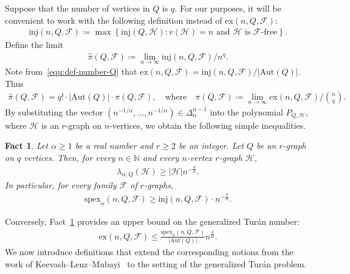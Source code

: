 \documentclass[11pt,a4paper]{article}
\newtheorem{fact}[definition]{Fact}
\begin{document}
Suppose that the number of vertices in $Q$ is $q$.
For our purposes, it will be convenient to work with the following definition instead of $\mathrm{ex}(n, Q, \mathcal{F})$: 
\begin{align*}
    \mathrm{inj}(n,Q,\mathcal{F})
    \coloneqq \max\left\{\mathrm{inj}(Q,\mathcal{H}) \colon  \text{$v(\mathcal{H}) = n$ and $\mathcal{H}$ is $\mathcal{F}$-free} \right\}. 
\end{align*}
%
Define the limit  
\begin{align*}
    \hat{\pi}(Q,\mathcal{F})
    \coloneqq \lim_{n \to \infty} {\mathrm{inj}(n,Q,\mathcal{F})}/{n^{q}}. 
\end{align*}
%
Note from~\eqref{equ:def-number-Q} that $\mathrm{ex}(n,Q,\mathcal{F}) = {\mathrm{inj}(n,Q,\mathcal{F})}/{|\mathrm{Aut}(Q)|}$. Thus 
\begin{align*}
    \hat{\pi}(Q,\mathcal{F})
    = q! \cdot |\mathrm{Aut}(Q)| \cdot \pi(Q,\mathcal{F}), 
    \quad\text{where}\quad 
    \pi(Q,\mathcal{F}) 
    \coloneqq \lim_{n \to \infty} {\mathrm{ex}(n,Q,\mathcal{F})}/{\binom{n}{q}}. 
\end{align*}
%
By substituting the vector $(n^{-1/\alpha}, \ldots, n^{-1/\alpha}) \in \Delta_{\alpha}^{n-1}$ into the polynomial $P_{Q,\mathcal{H}}$, where $\mathcal{H}$ is an $r$-graph on $n$-vertices, we obtain the following simple inequalities.
%
\begin{fact}\label{FACT:lower-bound-spex}
    Let $\alpha \ge 1$ be a real number and $r \ge 2$  be an integer. 
    Let $Q$ be an $r$-graph on $q$ vertices. 
    Then, for every $n \in \mathbb{N}$ and every $n$-vertex $r$-graph $\mathcal{H}$, 
    \begin{align*}
        \lambda_{\alpha, Q}(\mathcal{H}) \ge |\mathcal{H}| n^{-\frac{q}{\alpha}}. 
    \end{align*}
    In particular, for every family $\mathcal{F}$ of $r$-graphs, 
    \begin{align*}
        \mathrm{spex}_{\alpha}(n,Q,\mathcal{F})
        \ge {\mathrm{inj}(n,Q,\mathcal{F})} \cdot n^{-\frac{q}{\alpha}}.
    \end{align*}
\end{fact}

Conversely, Fact~\ref{FACT:lower-bound-spex} provides an upper bound on the generalized Tur\'{a}n number: 
\begin{align*}
    \mathrm{ex}(n,Q, \mathcal{F})
    \le \frac{\mathrm{spex}_{\alpha}(n,Q,\mathcal{F})}{|\mathrm{Aut}(Q)|} n^{\frac{q}{\alpha}}. 
\end{align*}
%
We now introduce definitions that extend the corresponding notions from the work of Keevash–Lenz–Mubayi~\cite{KLM14} to the setting of the generalized Tur\'{a}n problem.
\end{document}
